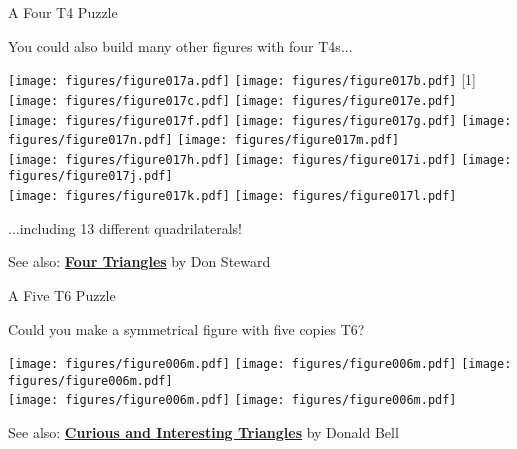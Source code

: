 \documentclass[14pt]{beamer}
\begin{document}
    \begin{frame}{A Four T4 Puzzle}
        \begin{center}
            You could also build many other figures with four T4s...
    
            \bigskip
    
            \texttt{[image: figures/figure017a.pdf]}\;\quad
            \texttt{[image: figures/figure017b.pdf]}\;\;
            \scalebox{-1}[1]{\texttt{[image: figures/figure017c.pdf]}}\;\quad
            \texttt{[image: figures/figure017e.pdf]}\\[-1ex]
            \texttt{[image: figures/figure017f.pdf]}\;\quad
            \texttt{[image: figures/figure017g.pdf]}\;\quad
            \texttt{[image: figures/figure017n.pdf]}
            \texttt{[image: figures/figure017m.pdf]}\\[2ex]
            \texttt{[image: figures/figure017h.pdf]}\;\quad
            \texttt{[image: figures/figure017i.pdf]}\;\quad
            \texttt{[image: figures/figure017j.pdf]}\\[2ex]
            \texttt{[image: figures/figure017k.pdf]}\;\quad
            \texttt{[image: figures/figure017l.pdf]}\;\quad
    
            \bigskip
    
            ...including 13 different quadrilaterals!\bigskip
    
            {\footnotesize See also: \textbf{\href{https://donsteward.blogspot.com.es/2012/03/four-triangles.html}{Four Triangles}} by Don Steward}
        \end{center}
    \end{frame}


    \begin{frame}{A Five T6 Puzzle}
        \begin{center}
            Could you make a symmetrical figure with five copies T6?

            \bigskip\bigskip

            \texttt{[image: figures/figure006m.pdf]}\qquad
            \texttt{[image: figures/figure006m.pdf]}\qquad
            \texttt{[image: figures/figure006m.pdf]}\\[3ex]\qquad
            \texttt{[image: figures/figure006m.pdf]}\qquad
            \texttt{[image: figures/figure006m.pdf]}

            \bigskip\medskip

            {\footnotesize See also: \textbf{\href{https://mathsjam.com/assets/talks/2015/DonaldBell-CuriousTriangles.pdf}{Curious and Interesting Triangles}} by Donald Bell}
        \end{center}
    \end{frame}
\end{document}
